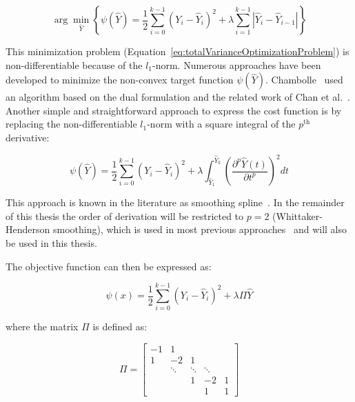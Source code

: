 \begin{equation}
	\arg\min_{\hat{Y}} \left\{ \psi(\hat{Y}) = \frac{1}{2}\sum_{i=0}^{k-1}{(Y_{i}-\hat{Y}_{i})^2+\lambda \sum_{i=1}^{k-1}{|\hat{Y}_{i}-\hat{Y}_{i-1}|}} \right\}
\label{eq:totalVarianceOptimizationProblem}
\end{equation}

This minimization problem (Equation~\ref{eq:totalVarianceOptimizationProblem}) is non-differentiable because of the $l_{1}$-norm. Numerous approaches have been developed to minimize the non-convex target function $\psi(\hat{Y})$. Chambolle~\cite{Chambolle1997,Chambolle2004,Chambolle2005} used an algorithm based on the dual formulation and the related work of Chan et al.~\cite{Chan2005,Chan2006}. Another simple and straightforward approach to express the cost function is by replacing the non-differentiable $l_{1}$-norm with a square integral of the $p^{\text{th}}$ derivative: %
 
\begin{equation}
	\psi(\hat{Y}) = \frac{1}{2}\sum_{i=0}^{k-1}{(Y_{i}-\hat{Y}_{i})^2}+\lambda \int_{\hat{Y}_{1}}^{\hat{Y}_{k}}{\left(\frac{\partial^{p}\hat{Y}(t)}{\partial t^{p}}\right)^{2}dt}
\label{eq:smoothingSpline}
\end{equation}

This approach is known in the literature as smoothing spline~\cite{Takezawa2005, Wahba1990, Schoenberg1964}. In the remainder of this thesis the order of derivation will be restricted to $p=2$ (Whittaker-Henderson smoothing), which is used in most previous approaches~\cite{Whittaker1922, Spoerl1937, Spoerl1941, Joseph1952, Eilers2003} and will also be used in this thesis.

The objective function can then be expressed as:

\begin{equation}
	\psi(x) = \frac{1}{2}\sum_{i=0}^{k-1}{(Y_{i}-\hat{Y}_{i})^2}+\lambda \Pi \hat{Y}
	\label{eq:whittakerHendersonSmoothing}
\end{equation}

where the matrix $\Pi$ is defined as:

\begin{equation}
	\Pi = 
	\begin{bmatrix}
		-1 & 1 & & &\\
		1 & -2 & 1 & & \\
		& \ddots & \ddots & \ddots & \\
		& & 1 & -2 & 1 \\
		& & & 1 & 1
	\end{bmatrix}
\label{eq:}
\end{equation}

